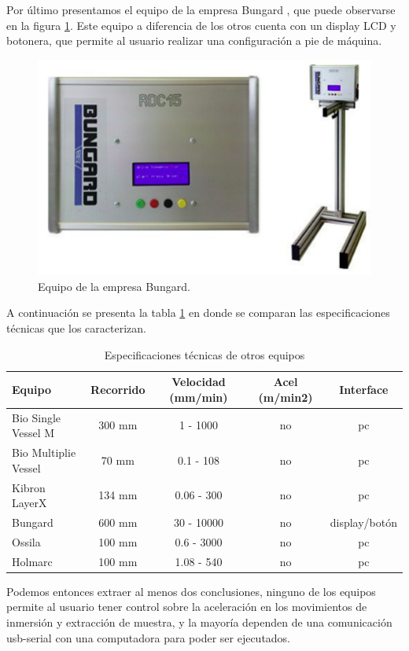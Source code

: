 Por último presentamos el equipo de la empresa Bungard \citep{6_web_bungard}, que puede observarse en la figura \ref{fig:dip_bungard}.
Este equipo a diferencia de los otros cuenta con un display LCD y botonera, que permite al usuario realizar una configuración a pie de máquina.

\begin{figure}[htbp]
	\centering
	\includegraphics[width=.45\textwidth]{./Figures/6_bungard.pdf}
	\caption{Equipo de la empresa Bungard.}
	\label{fig:dip_bungard}
\end{figure}

A continuación se presenta la tabla \ref{tab:equipos_competencia} en donde se comparan las especificaciones técnicas que los caracterizan.

\begin{table}[h]
	\centering
	\caption[Dip coaters en el mercado]{Especificaciones técnicas de otros equipos}
	\begin{tabular}{l c c c c}    
		\toprule
		\textbf{Equipo} 	 & \textbf{Recorrido}  & \textbf{Velocidad (mm/min)}  & \textbf{Acel (m/min2)}  & \textbf{Interface} \\
		\midrule
		Bio Single Vessel M	& 300 mm 	& 1    - 1000   & no & pc 							\\		
		Bio Multiplie Vessel		& 70  mm	& 0.1  - 108 	& no & pc					\\
		Kibron LayerX				& 134 mm	& 0.06 - 300	& no & pc					\\
		Bungard						& 600 mm	& 30 - 10000	& no & display/botón		\\
		Ossila \citep{4_web_ossila}					& 100 mm	& 0.6  - 3000	& no & pc		\\
		Holmarc	\citep{5_web_holmarc}					& 100 mm	& 1.08 - 540	& no & pc		\\
		\bottomrule
		\hline
	\end{tabular}
	\label{tab:equipos_competencia}
\end{table}

Podemos entonces extraer al menos dos conclusiones, ninguno de los equipos permite al usuario tener control sobre la aceleración en los movimientos de inmersión y extracción de muestra, y la mayoría  dependen de una comunicación usb-serial con una computadora para poder ser ejecutados.  

